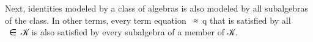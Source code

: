 \begin{code}
\AgdaSpace{}%
\AgdaSpace{}%
\AgdaSpace{}%
\AgdaSymbol{)}\AgdaSpace{}%
\<%
\\
%
\>[8]\AgdaSymbol{(}\AgdaSpace{}%
\AgdaSpace{}%
\AgdaSymbol{)(}\AgdaSpace{}%
\AgdaSpace{}%
\AgdaSpace{}%
\AgdaSpace{}%
\AgdaSymbol{)}\AgdaSpace{}%
\AgdaSpace{}%
\AgdaSymbol{(}\AgdaSpace{}%
\AgdaSpace{}%
\AgdaSpace{}%
\AgdaSpace{}%
\AgdaSymbol{)}\AgdaSpace{}%
\<%
\\
%
\>[8]\AgdaSpace{}%
\AgdaSpace{}%
\AgdaSymbol{((}\AgdaSpace{}%
\AgdaSpace{}%
\AgdaSymbol{)}\AgdaSpace{}%
\AgdaSymbol{)}%
\>[27]\<%
\end{code}
\ccpad
Next, identities modeled by a class of algebras is also modeled by all subalgebras of the class. In other terms, every term equation ~\af ≈~\ab q that is satisfied by all ~\af ∈~\ab 𝒦 is also satisfied by every subalgebra of a member of \ab 𝒦.
\ccpad
